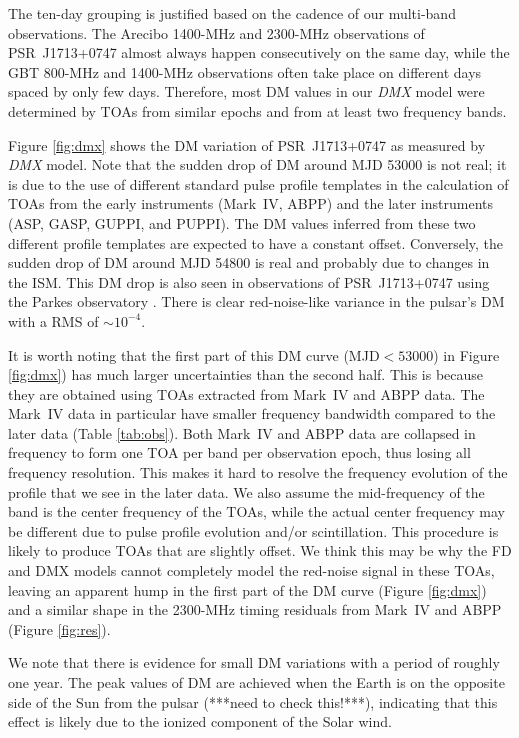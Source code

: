 The ten-day grouping is justified based on the cadence of our multi-band
observations.
The Arecibo 1400-MHz and 2300-MHz observations of PSR~J1713+0747 almost
always happen consecutively on
the same day, while the GBT 800-MHz and 1400-MHz observations often take place on different
days spaced by only few days.
Therefore, most DM values in our {\it DMX} model were determined by TOAs from
similar epochs and from at least two frequency bands. 

Figure \ref{fig:dmx} shows the DM variation of
PSR~J1713+0747 as measured by {\it DMX} model.
Note that the sudden drop of DM around MJD 53000 is not real; it is due to
the use of different standard pulse profile templates in the calculation of
TOAs from the early instruments (Mark~IV, ABPP) and the later instruments
(ASP, GASP, GUPPI, and PUPPI). The DM values inferred from these two different
profile templates are expected to have a constant offset.
Conversely, the sudden drop of DM around MJD 54800 is real and probably
due to changes in the ISM. This DM drop is also seen in observations of
PSR~J1713+0747 using the Parkes observatory \citep{kcs+13}.
There is clear red-noise-like variance in the pulsar's DM with a RMS of
$\sim10^{-4}$. 

It is worth noting that the first part of this DM curve (MJD$<53000$) in
Figure \ref{fig:dmx}) has much larger uncertainties than the second half.
This is because they are obtained using TOAs extracted from
Mark~IV and ABPP data.  The Mark~IV data in particular have smaller frequency bandwidth 
compared to the later data (Table \ref{tab:obs}).
Both Mark~IV and ABPP data are collapsed in frequency to form one TOA per band per
observation epoch, thus losing all frequency resolution. This makes it hard to
resolve the frequency evolution of the profile that we see in the later data. We
also assume the mid-frequency of the band is the center frequency 
of the TOAs, while the actual center frequency may be different due to pulse
profile evolution and/or scintillation. This procedure is likely to produce TOAs that are slightly offset. We think this may be why the FD and
DMX models cannot completely model the red-noise signal in these TOAs, leaving
an apparent hump in the first part of the DM curve (Figure \ref{fig:dmx}) and 
a similar shape in the 2300-MHz timing residuals from Mark~IV and ABPP (Figure
\ref{fig:res}).

We note that there is evidence for small DM variations with a period
of roughly one year.  The peak values of DM are achieved when the
Earth is on the opposite side of the Sun from the pulsar (***need to
check this!***), indicating that this effect is likely due to the
ionized component of the Solar wind.

